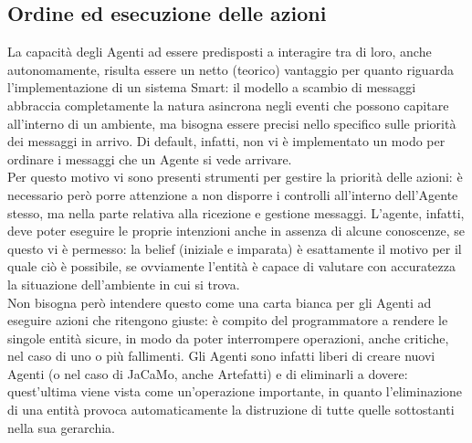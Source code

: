 \documentclass[12pt,a4paper,openright,oneside]{report}
\begin{document}
\subsection{Ordine ed esecuzione delle azioni}
La capacità degli Agenti ad essere predisposti a interagire tra di loro, anche autonomamente, risulta essere un netto (teorico) vantaggio per quanto riguarda l'implementazione di un sistema Smart: il modello a scambio di messaggi abbraccia completamente la natura asincrona negli eventi che possono capitare all'interno di un ambiente, ma bisogna essere precisi nello specifico sulle priorità dei messaggi in arrivo. Di default, infatti, non vi è implementato un modo per ordinare i messaggi che un Agente si vede arrivare.\\

Per questo motivo vi sono presenti strumenti per gestire la priorità delle azioni: è necessario però porre attenzione a non disporre i controlli all'interno dell'Agente stesso, ma nella parte relativa alla ricezione e gestione messaggi. L'agente, infatti, deve poter eseguire le proprie intenzioni anche in assenza di alcune conoscenze, se questo vi è permesso: la belief (iniziale e imparata) è esattamente il motivo per il quale ciò è possibile, se ovviamente l'entità è capace di valutare con accuratezza la situazione dell'ambiente in cui si trova.\\

Non bisogna però intendere questo come una carta bianca per gli Agenti ad eseguire azioni che ritengono giuste: è compito del programmatore a rendere le singole entità sicure, in modo da poter interrompere operazioni, anche critiche, nel caso di uno o più fallimenti. Gli Agenti sono infatti liberi di creare nuovi Agenti (o nel caso di JaCaMo, anche Artefatti) e di eliminarli a dovere: quest'ultima viene vista come un'operazione importante, in quanto l'eliminazione di una entità provoca automaticamente la distruzione di tutte quelle sottostanti nella sua gerarchia.\\
\end{document}
